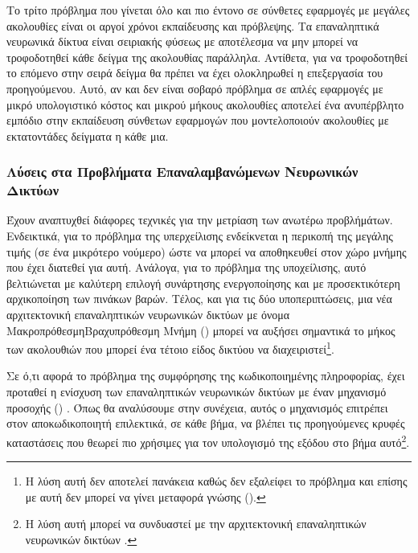 Το τρίτο πρόβλημα που γίνεται όλο και πιο έντονο σε σύνθετες εφαρμογές με μεγάλες ακολουθίες είναι οι αργοί χρόνοι εκπαίδευσης και πρόβλεψης. Τα επαναληπτικά νευρωνικά δίκτυα είναι σειριακής φύσεως με αποτέλεσμα να μην μπορεί να τροφοδοτηθεί κάθε δείγμα της ακολουθίας παράλληλα. Αντίθετα, για να τροφοδοτηθεί το επόμενο στην σειρά δείγμα θα πρέπει να έχει ολοκληρωθεί η επεξεργασία του προηγούμενου. Αυτό, αν και δεν είναι σοβαρό πρόβλημα σε απλές εφαρμογές με μικρό υπολογιστικό κόστος και μικρού μήκους ακολουθίες αποτελεί ένα ανυπέρβλητο εμπόδιο στην εκπαίδευση σύνθετων εφαρμογών που μοντελοποιούν ακολουθίες με εκτατοντάδες δείγματα η κάθε μια.

\subsubsection{Λύσεις στα Προβλήματα Επαναλαμβανώμενων Νευρωνικών Δικτύων}

Έχουν αναπτυχθεί διάφορες τεχνικές για την μετρίαση των ανωτέρω προβλήμάτων. Ενδεικτικά, για το πρόβλημα της υπερχείλισης ενδείκνεται η περικοπή της μεγάλης τιμής (σε ένα μικρότερο νούμερο) ώστε να μπορεί να αποθηκευθεί στον χώρο μνήμης που έχει διατεθεί για αυτή\cite{youtubeRNN}. Ανάλογα, για το πρόβλημα της υποχείλισης, αυτό βελτιώνεται με καλύτερη επιλογή συνάρτησης ενεργοποίησης και με προσεκτικότερη αρχικοποίηση των πινάκων βαρών\cite{youtubeRNN}. Τέλος, και για τις δύο υποπεριπτώσεις, μια νέα αρχιτεκτονική επαναληπτικών νευρωνικών δικτύων με όνομα Μακροπρόθεσμη\textendash Βραχυπρόθεσμη Μνήμη ()\cite{hochreiter1997lstm} μπορεί να αυξήσει σημαντικά το μήκος των ακολουθιών που μπορεί ένα τέτοιο είδος δικτύου να διαχειριστεί\footnote{Η λύση αυτή δεν αποτελεί πανάκεια καθώς δεν εξαλείφει το πρόβλημα και επίσης με αυτή δεν μπορεί να γίνει μεταφορά γνώσης ()\cite{youtubeRNNleo}.}.\par

Σε ό,τι αφορά το πρόβλημα της συμφόρησης της κωδικοποιημένης πληροφορίας, έχει προταθεί η ενίσχυση των επαναληπτικών νευρωνικών δικτύων με έναν μηχανισμό προσοχής () \cite{rumelhart1985learning_internal_representations}. Όπως θα αναλύσουμε στην συνέχεια, αυτός ο μηχανισμός επιτρέπει στον αποκωδικοποιητή επιλεκτικά, σε κάθε βήμα, να βλέπει τις προηγούμενες κρυφές καταστάσεις που θεωρεί πιο χρήσιμες για τον υπολογισμό της εξόδου στο βήμα αυτό\footnote{Η λύση αυτή μπορεί να συνδυαστεί με την αρχιτεκτονική επαναληπτικών νευρωνικών δικτύων .}. \par

